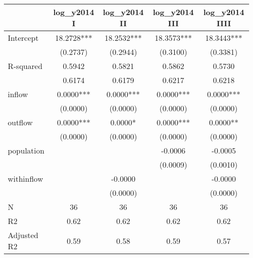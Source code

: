 \begin{table}
\caption{}
\begin{center}
\begin{tabular}{lcccc}
\hline
            & log\_y2014 I & log\_y2014 II & log\_y2014 III & log\_y2014 IIII  \\
\midrule
Intercept   & 18.2728***   & 18.2532***    & 18.3573***     & 18.3443***       \\
            & (0.2737)     & (0.2944)      & (0.3100)       & (0.3381)         \\
R-squared   & 0.5942       & 0.5821        & 0.5862         & 0.5730           \\
            & 0.6174       & 0.6179        & 0.6217         & 0.6218           \\
inflow      & 0.0000***    & 0.0000***     & 0.0000***      & 0.0000***        \\
            & (0.0000)     & (0.0000)      & (0.0000)       & (0.0000)         \\
outflow     & 0.0000***    & 0.0000*       & 0.0000***      & 0.0000**         \\
            & (0.0000)     & (0.0000)      & (0.0000)       & (0.0000)         \\
population  &              &               & -0.0006        & -0.0005          \\
            &              &               & (0.0009)       & (0.0010)         \\
withinflow  &              & -0.0000       &                & -0.0000          \\
            &              & (0.0000)      &                & (0.0000)         \\
N           & 36           & 36            & 36             & 36               \\
R2          & 0.62         & 0.62          & 0.62           & 0.62             \\
Adjusted R2 & 0.59         & 0.58          & 0.59           & 0.57             \\
\hline
\end{tabular}
\end{center}
\end{table}